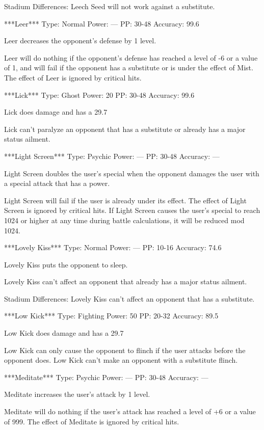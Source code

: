 \documentclass[reprint, aps, prl, paper=A4]{revtex4-1}
\begin{document}
Stadium Differences:
Leech Seed will not work against a substitute.


***Leer***
Type: Normal
Power: ---
PP: 30-48
Accuracy: 99.6%

Leer decreases the opponent's defense by 1 level.

Leer will do nothing if the opponent's defense has reached a level of -6 or a value of 1, and
will fail if the opponent has a substitute or is under the effect of Mist. The effect of Leer
is ignored by critical hits.


***Lick***
Type: Ghost
Power: 20
PP: 30-48
Accuracy: 99.6%

Lick does damage and has a 29.7%

Lick can't paralyze an opponent that has a substitute or already has a major status ailment.


***Light Screen***
Type: Psychic
Power: ---
PP: 30-48
Accuracy: ---

Light Screen doubles the user's special when the opponent damages the user with a special
attack that has a power.

Light Screen will fail if the user is already under its effect. The effect of Light Screen is
ignored by critical hits. If Light Screen causes the user's special to reach 1024 or higher at
any time during battle calculations, it will be reduced mod 1024.


***Lovely Kiss***
Type: Normal
Power: ---
PP: 10-16
Accuracy: 74.6%

Lovely Kiss puts the opponent to sleep.

Lovely Kiss can't affect an opponent that already has a major status ailment.

Stadium Differences:
Lovely Kiss can't affect an opponent that has a substitute.


***Low Kick***
Type: Fighting
Power: 50
PP: 20-32
Accuracy: 89.5%

Low Kick does damage and has a 29.7%

Low Kick can only cause the opponent to flinch if the user attacks before the opponent does.
Low Kick can't make an opponent with a substitute flinch.


***Meditate***
Type: Psychic
Power: ---
PP: 30-48
Accuracy: ---

Meditate increases the user's attack by 1 level.

Meditate will do nothing if the user's attack has reached a level of +6 or a value of 999. The
effect of Meditate is ignored by critical hits.
\end{document}
